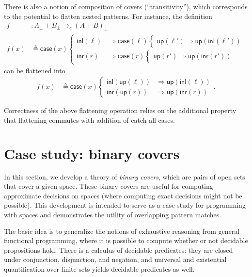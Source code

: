\documentclass[conference]{IEEEtran}
\newcommand{\cto}{\to_c}
\newcommand{\Branch}{\Rightarrow}
\newcommand{\up}{\mathsf{up}}
\begin{document}
There is also a notion of composition of covers (``transitivity''), which corresponds to the potential to flatten nested patterns. For instance, the definition
\begin{align*}
f &: A_\bot + B_\bot \cto \left(A + B\right)_\bot
\\ f(x) &\triangleq \mathsf{case}(x)
\begin{cases}
\mathsf{inl}(\ell) &\Branch \mathsf{case}(\ell)
  \begin{cases}
  \up(\ell') \Branch \up(\mathsf{inl}(\ell'))
  \end{cases}
\\
\mathsf{inr}(r) &\Branch \mathsf{case}(r)
  \begin{cases}
  \up(r') \Branch \up(\mathsf{inr}(r'))
  \end{cases}
\end{cases}
\end{align*}
can be flattened into
\begin{align*}
f(x) &\triangleq \mathsf{case}(x)
\begin{cases}
\mathsf{inl}(\up(\ell)) &\Branch \up(\mathsf{inl}(\ell))
\\
\mathsf{inr}(\up(r)) &\Branch \up(\mathsf{inr}(r))
\end{cases}.
\end{align*}

Correctness of the above flattening operation relies on the additional property that flattening commutes with addition of catch-all cases.

\section{Case study: binary covers}
\label{s:bcover}

In this section, we develop a theory of \emph{binary covers}, which are pairs of open sets that cover a given space. These binary covers are useful for computing approximate decisions on spaces (where computing exact decisions might not be possible). This development is intended to serve as a case study for programming with spaces and demonstrates the utility of overlapping pattern matches.

The basic idea is to generalize the notions of exhaustive reasoning from general functional programming, where it is possible to compute whether or not decidable propositions hold. There is a calculus of decidable predicates: they are closed under conjunction, disjunction, and negation, and universal and existential quantification over finite sets yields decidable predicates as well.
\end{document}
